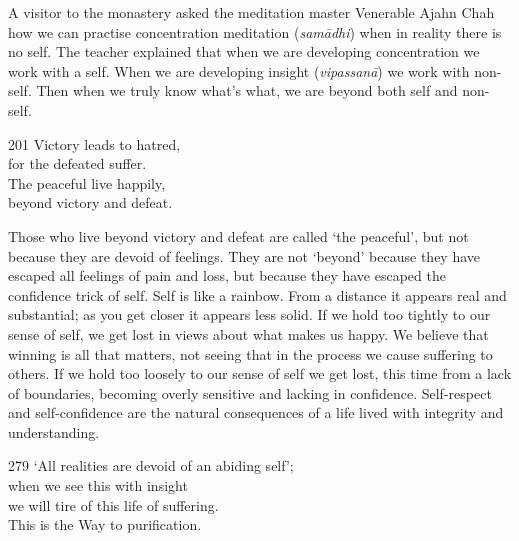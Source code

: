 \begin{dhpRefl}
  A visitor to the monastery asked the meditation master Venerable Ajahn Chah how we can practise concentration meditation (\emph{samādhi}) when in reality there is no self. The teacher explained that when we are developing concentration we work with a self. When we are developing insight (\emph{vipassanā}) we work with non-self. Then when we truly know what's what, we are beyond both self and non-self.
\end{dhpRefl}


\begin{dhpVerse}{201}
\label{dhp-201}
Victory leads to hatred,\\
for the defeated suffer.\\
The peaceful live happily,\\
beyond victory and defeat.
\end{dhpVerse}

\begin{dhpRefl}
Those who live beyond victory and defeat are called `the peaceful', but not because they are devoid of feelings. They are not `beyond' because they have escaped all feelings of pain and loss, but because they have escaped the confidence trick of self. Self is like a rainbow. From a distance it appears real and substantial; as you get closer it appears less solid. If we hold too tightly to our sense of self, we get lost in views about what makes us happy. We believe that winning is all that matters, not seeing that in the process we cause suffering to others. If we hold too loosely to our sense of self we get lost, this time from a lack of boundaries, becoming overly sensitive and lacking in confidence. Self-respect and self-confidence are the natural consequences of a life lived with integrity and understanding.
\end{dhpRefl}


\begin{dhpVerse}{279}
\label{dhp-279}
`All realities are devoid of an abiding self';\\
when we see this with insight\\
we will tire of this life of suffering.\\
This is the Way to purification.
\end{dhpVerse}

